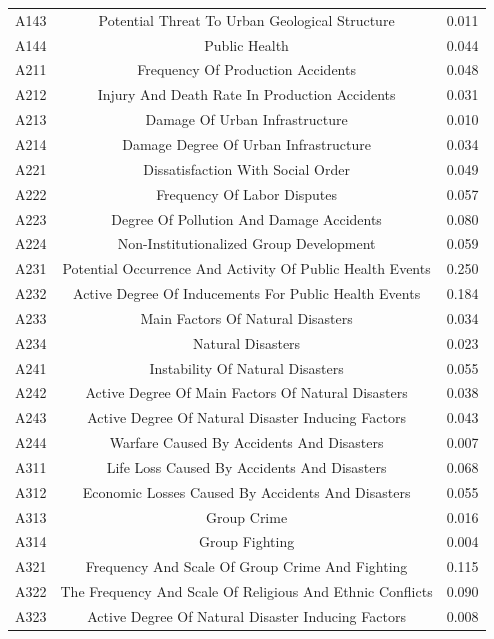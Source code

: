 \documentclass[12pt]{article}  %
\begin{document}
\begin{subappendices}
\begin{table}[!ht]
\begin{tabular}{ccc}
        A143 & Potential Threat To Urban Geological Structure&0.011  \\ 
        A144 &  Public Health&0.044 \\ 
        A211 & Frequency Of Production Accidents&0.048  \\ 
        A212 & Injury And Death Rate In Production Accidents&0.031  \\ 
        A213 & Damage Of Urban Infrastructure&0.010 \\ 
        A214 & Damage Degree Of Urban Infrastructure &0.034 \\ 
        A221 & Dissatisfaction With Social Order &0.049 \\ 
        A222 & Frequency Of Labor Disputes &0.057 \\ 
        A223 & Degree Of Pollution And Damage Accidents &0.080 \\ 
        A224 & Non-Institutionalized Group Development &0.059 \\ 
        A231 & Potential Occurrence And Activity Of Public Health Events &0.250 \\ 
        A232 & Active Degree Of Inducements For Public Health Events &0.184 \\ 
        A233 & Main Factors Of Natural Disasters &0.034\\ 
        A234 & Natural Disasters &0.023\\ 
        A241 & Instability Of Natural Disasters &0.055 \\ 
        A242 & Active Degree Of Main Factors Of Natural Disasters  &0.038\\ 
        A243 & Active Degree Of Natural Disaster Inducing Factors  &0.043\\ 
        A244 & Warfare Caused By Accidents And Disasters &0.007 \\ 
        A311 & Life Loss Caused By Accidents And Disasters &0.068 \\ 
        A312 & Economic Losses Caused By Accidents And Disasters  &0.055\\ 
        A313 & Group Crime &0.016 \\ 
        A314 & Group Fighting  &0.004\\ 
        A321 & Frequency And Scale Of Group Crime And Fighting&0.115  \\ 
        A322 & The Frequency And Scale Of Religious And Ethnic Conflicts &0.090 \\ 
        A323 & Active Degree Of Natural Disaster Inducing Factors  &0.008\\ 

\end{tabular}
\end{table}
\end{subappendices}
\end{document}
